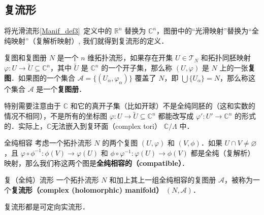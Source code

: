 

\subsection{复流形}

将光滑流形\autoref{Manif_def3}~定义中的 $\mathbb{R}^n$ 替换为 $\mathbb{C}^n$，图册中的“光滑映射”替换为“全纯映射”（复解析映射）, 我们就得到复流形的定义．


\begin{definition}{复图和复图册}
$N$ 是一个 $n$ 维拓扑流形，如果存在开集 $U \in \mathcal{T}_N$ 和拓扑同胚映射 $\varphi: U \rightarrow \tilde{U} \subseteq \mathbb{C}^n$，其中 $\tilde{U}$ 是 $\mathbb{C}^n$ 的一个开子集，那么称 $(U,\varphi)$ 是 $N$ 上的一张\textbf{复图}．如果图的一个集合 $\mathcal{A}=\{(U_\alpha, \varphi_\alpha)\}$ 覆盖了 $N$，即 $\bigcup\{U_\alpha\}=N$，那么称这个集合 $\mathcal{A}$ 是一个\textbf{复图册}．
\end{definition}

特别需要注意由于 $\mathbb{C}$ 和它的真开子集（比如开球）不是全纯同胚的（这和实数的情况不相同），不是所有的坐标图 $\varphi: U \rightarrow \tilde{U} \subseteq \mathbb{C}^n$ 都能改写成 $\varphi': U' \rightarrow \mathbb{C}^n$ 的形式的．实际上，$\mathbb{C}$无法嵌入到复环面（complex tori） $\mathbb{C} / \Lambda$ 中．



\begin{definition}{全纯相容}
考虑一个拓扑流形 $N$ 的两个复图 $(U, \varphi)$ 和 $(V, \phi)$．如果 $U \cap V \neq \varnothing$，且 $\varphi \circ \phi^{-1}: \phi(V) \rightarrow \varphi(U)$ 和 $\phi \circ \varphi^{-1}: \varphi(U) \rightarrow \phi(V)$ 都是全纯（复解析）映射，那么我们称这两个图是\textbf{全纯相容的（compatible）}．
\end{definition}

\begin{definition}{复（全纯）流形}\label{CMani_def1}
一个拓扑流形 $N$ 和加上其上一组全纯相容的复图册 $\mathcal{A}$，被称为一个\textbf{复流形（complex (holomorphic) manifold）} $(N, \mathcal{A})$．
\end{definition}

\begin{theorem}{}
复流形都是可定向实流形．
\end{theorem}

